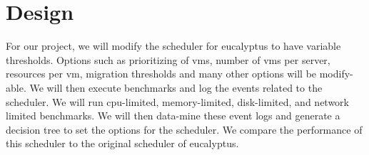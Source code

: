 \section{Design}
For our project, we will modify the scheduler for eucalyptus to have variable thresholds.  Options such as prioritizing of vms, number of vms per server, resources per vm, migration thresholds and many other options will be modify-able.  We will then execute benchmarks and log the events related to the scheduler.  We will run cpu-limited, memory-limited, disk-limited, and network limited benchmarks.  We will then data-mine these event logs and generate a decision tree to set the options for the scheduler.  We compare the performance of this scheduler to the original scheduler of eucalyptus.
